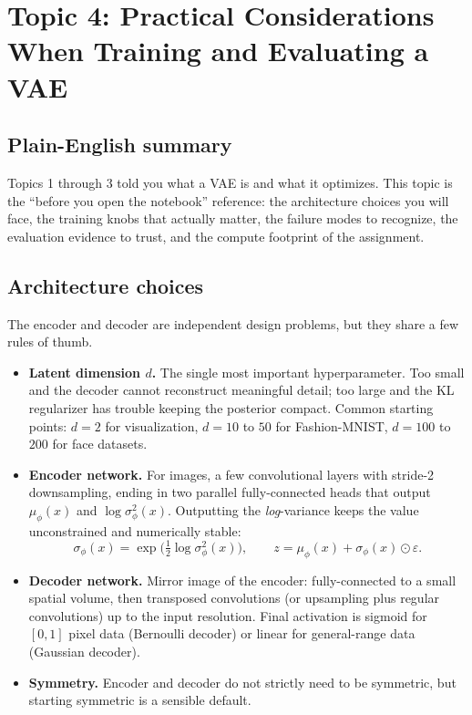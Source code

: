 \documentclass[11pt]{article}
\theoremstyle{remark}
\begin{document}
\section{Topic 4: Practical Considerations When Training and Evaluating a VAE}

\subsection{Plain-English summary}
Topics 1 through 3 told you what a VAE is and what it optimizes. This topic is the ``before you open the notebook'' reference: the architecture choices you will face, the training knobs that actually matter, the failure modes to recognize, the evaluation evidence to trust, and the compute footprint of the assignment.

\subsection{Architecture choices}
The encoder and decoder are independent design problems, but they share a few rules of thumb.
\begin{itemize}[leftmargin=1.2em]
  \item \textbf{Latent dimension $d$.} The single most important hyperparameter. Too small and the decoder cannot reconstruct meaningful detail; too large and the KL regularizer has trouble keeping the posterior compact. Common starting points: $d=2$ for visualization, $d=10$ to $50$ for Fashion-MNIST, $d=100$ to $200$ for face datasets.
  \item \textbf{Encoder network.} For images, a few convolutional layers with stride-2 downsampling, ending in two parallel fully-connected heads that output $\mu_\phi(x)$ and $\log\sigma^2_\phi(x)$. Outputting the \emph{log}-variance keeps the value unconstrained and numerically stable:
  \[
  \sigma_\phi(x) = \exp\!\big(\tfrac12 \log\sigma^2_\phi(x)\big), \qquad z=\mu_\phi(x)+\sigma_\phi(x)\odot\varepsilon .
  \]
  \item \textbf{Decoder network.} Mirror image of the encoder: fully-connected to a small spatial volume, then transposed convolutions (or upsampling plus regular convolutions) up to the input resolution. Final activation is sigmoid for $[0,1]$ pixel data (Bernoulli decoder) or linear for general-range data (Gaussian decoder).
  \item \textbf{Symmetry.} Encoder and decoder do not strictly need to be symmetric, but starting symmetric is a sensible default.
\end{itemize}
\end{document}
